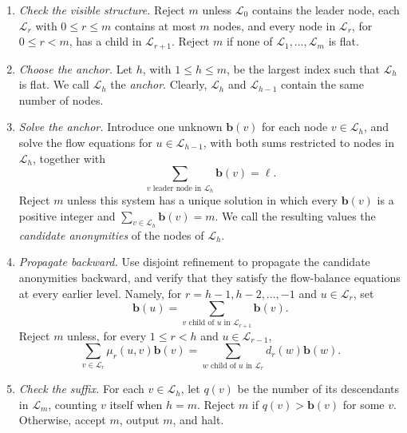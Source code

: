 \documentclass[11pt]{article}
\newcommand{\cand}{\mathbf b}
\begin{document}
\begin{enumerate}[label=\arabic*.,wide=0pt]
\item \emph{Check the visible structure.}
      Reject \(m\) unless \(\mathcal L_0\) contains the leader node, each
      \(\mathcal L_r\) with \(0\leq r\leq m\) contains at most \(m\) nodes,
      and every node in \(\mathcal L_r\), for \(0\leq r<m\), has a child in
      \(\mathcal L_{r+1}\).  Reject \(m\) if none of
      \(\mathcal L_1,\ldots,\mathcal L_m\) is
      flat.

\item \emph{Choose the anchor.}
      Let \(h\), with \(1\leq h\leq m\), be the largest index such that
      \(\mathcal L_h\) is flat.  We call \(\mathcal L_h\) the \emph{anchor}.
      Clearly, \(\mathcal L_h\) and \(\mathcal L_{h-1}\) contain the same
      number of nodes.

\item \emph{Solve the anchor.}
      Introduce one unknown \(\cand(v)\) for each node
      \(v\in\mathcal L_h\),
      and solve the flow equations for
      \(u\in\mathcal L_{h-1}\), with both sums restricted to nodes in
      \(\mathcal L_h\), together with
      \[
       \sum_{v\text{ leader node in }\mathcal L_h}\cand(v)
       =\ell.
      \]
      Reject \(m\) unless this system has a unique
      solution in which every \(\cand(v)\) is a positive
      integer and \(\sum_{v\in\mathcal L_h}\cand(v)=m\).  We call the resulting values
      the \emph{candidate anonymities} of the nodes of \(\mathcal L_h\).

\item \emph{Propagate backward.}
      Use disjoint refinement to propagate the candidate anonymities backward,
      and verify that they satisfy the flow-balance equations at every earlier level.
      Namely, for \(r=h-1,h-2,\ldots,-1\) and \(u\in\mathcal L_r\), set
      \[
       \cand(u)=
       \sum_{v\text{ child of }u \text{ in }\mathcal L_{r+1}}\cand(v).
      \]
      Reject \(m\) unless, for every \(1\leq r<h\) and
      \(u\in\mathcal L_{r-1}\),
      \[
       \sum_{v\in\mathcal L_r}\mu_r(u,v)\cand(v)
       =
       \sum_{w\text{ child of }u \text{ in }\mathcal L_r}
       d_r(w)\cand(w).
      \]

\item \emph{Check the suffix.}
      For each \(v\in\mathcal L_h\), let \(q(v)\) be the
      number of its descendants in \(\mathcal L_m\), counting
      \(v\) itself when \(h=m\).  Reject \(m\) if
      \(q(v)>\cand(v)\) for some \(v\).  Otherwise, accept \(m\), output
      \(m\), and halt.
\end{enumerate}
\end{document}
